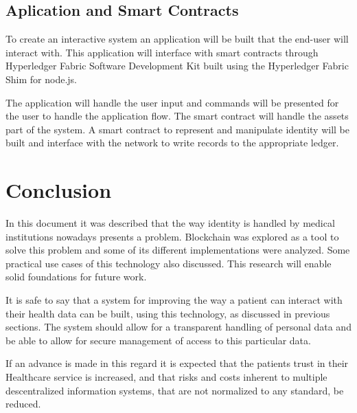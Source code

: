 \documentclass[notitlepage]{llncs}
\begin{document}
\subsection{Aplication and Smart Contracts}

To create an interactive system an application will be built that the end-user will interact with. This application will interface with smart contracts through Hyperledger Fabric Software Development Kit built using the Hyperledger Fabric Shim for node.js.
\par
The application will handle the user input and commands will be presented for the user to handle the application flow. The smart contract will handle the assets part of the system. A smart contract to represent and manipulate identity will be built and interface with the network to write records to the appropriate ledger.
\newpage


\section{Conclusion} \label{conclusion}
In this document it was described that the way identity is handled by medical institutions nowadays presents a problem. Blockchain was explored as a tool to solve this problem and some of its different implementations were analyzed. Some practical use cases of this technology also discussed. This research will enable solid foundations for future work.
\par
It is safe to say that a system for improving the way a patient can interact with their health data can be built, using this technology, as discussed in previous sections. The system should allow for a transparent handling of personal data and be able to allow for secure management of access to this particular data.
\par
If an advance is made in this regard it is expected that the patients trust in their Healthcare service is increased, and that risks and costs inherent to multiple descentralized information systems, that are not normalized to any standard, be reduced. 
\newpage


\begingroup
\nocite{*}
\raggedright


\endgroup
\end{document}
